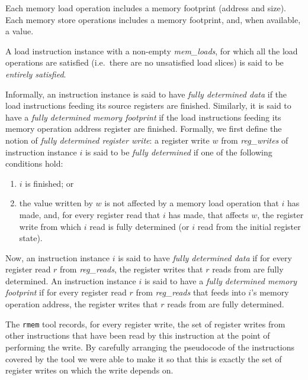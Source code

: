 Each memory load operation includes a memory footprint (address and size).
Each memory store operations includes a memory footprint, and, when available, a value.

A load instruction instance with a non-empty {\it mem\_loads}, for which all the load operations are satisfied (i.e.~there are no unsatisfied load slices) is said to be {\it entirely satisfied}.

Informally, an instruction instance is said to have {\it fully determined data} if the load instructions feeding its source registers are finished.
Similarly, it is said to have a {\it fully determined memory footprint} if the load instructions feeding its memory operation address register are finished.
%
Formally, we first define the notion of {\it fully determined register write}: a register write $w$ from {\it reg\_writes} of instruction instance $i$ is said to be {\it fully determined} if one of the following conditions hold:
\begin{enumerate}
\item $i$ is finished; or
\item the value written by $w$ is not affected by a memory load operation that $i$ has made, and, for every register read that $i$ has made, that affects $w$, the register write from which $i$ read is fully determined (or $i$ read from the initial register state).
\end{enumerate}
Now, an instruction instance $i$ is said to have  {\it fully determined data} if for every register read $r$ from {\it reg\_reads}, the register writes that $r$ reads from are fully determined.
An instruction instance $i$ is said to have a {\it fully determined memory footprint} if for every register read $r$ from {\it reg\_reads} that feeds into $i$'s memory operation address, the register writes that $r$ reads from are fully determined.
\begin{commentary}
The {\tt rmem} tool records, for every register write, the set of register writes from other instructions that have been read by this instruction at the point of performing the write.
By carefully arranging the pseudocode of the instructions covered by the tool we were able to make it so that this is exactly the set of register writes on which the write depends on.
\end{commentary}


